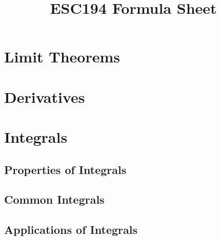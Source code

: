 \documentclass{article}
\title{ESC194 Formula Sheet}
\begin{document}
\section{Limit Theorems}

\section{Derivatives}

\section{Integrals}

\subsection{Properties of Integrals}

\subsection{Common Integrals}

\subsection{Applications of Integrals}

\newpage
\end{document}
